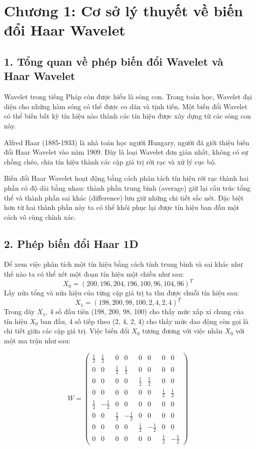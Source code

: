 \section*{Chương 1: Cơ sở lý thuyết về biến đổi Haar Wavelet}

\subsection*{1. Tổng quan về phép biến đổi Wavelet và Haar Wavelet}
Wavelet trong tiếng Pháp còn được hiểu là sóng con. Trong toán học, Wavelet đại diện cho những hàm sóng
có thể được co dãn và tịnh tiến. Một biến đổi Wavelet có thể biến bất kỳ tín hiệu nào thành các tín hiệu được xây dựng
từ các sóng con này.

Alfred Haar (1885-1933) là nhà toán học người Hungary, người đã giới thiệu biến đổi Haar Wavelet vào năm 1909. 
Đây là loại Wavelet đơn giản nhất, không có sự chồng chéo, chia tín hiệu thành các cặp giá trị rời rạc và xử lý cục bộ.

Biến đổi Haar Wavelet hoạt động bằng cách phân tách tín hiệu rời rạc thành hai phần có độ dài bằng nhau: 
thành phần trung bình (average) giữ lại cấu trúc tổng thể và thành phần sai khác (difference) lưu giữ những chi tiết sắc nét.
Đặc biệt hơn từ hai thành phần này ta có thể khôi phục lại được tín hiệu ban đầu một cách vô cùng chính xác. 

\subsection*{2. Phép biến đổi Haar 1D}
Để xem việc phân tích một tín hiệu bằng cách tính trung bình và sai khác như thế nào ta có thể xét một đoạn tín hiệu một chiều như sau:
$$X_{0}=(200,196,204,196,100,96,104,96)^T$$
Lấy nửa tổng và nửa hiệu của từng cặp giá trị ta thu được chuỗi tín hiệu sau:
$$X_{1} = (198, 200, 98, 100, 2, 4, 2, 4)^T$$
Trong dãy $X_{1}$, 4 số đầu tiên (198, 200, 98, 100) cho thấy mức xấp xỉ chung của tín hiệu $X_0$ ban đầu, 4 số tiếp theo (2, 4, 2, 4) cho thấy mức dao động còn gọi là chi tiết giữa 
các cặp giá trị. Việc biến đổi $X_0$ tương đương với việc nhân $X_0$ với một ma trận như sau:
\begin{center}
    $$W = \begin{pmatrix}
        \frac{1}{2} &  \frac{1}{2} &  0 &  0 &  0 &  0 &  0 &  0 \\
        0 &  0 &  \frac{1}{2} &  \frac{1}{2} &  0 &  0 &  0 &  0 \\
        0 &  0 &  0 &  0 &  \frac{1}{2} &  \frac{1}{2} &  0 &  0 \\
        0 &  0 &  0 &  0 &  0 &  0 &  \frac{1}{2} &  \frac{1}{2} \\
        \frac{1}{2} & -\frac{1}{2} &  0 &  0 &  0 &  0 &  0 &  0 \\
        0 &  0 &  \frac{1}{2} & -\frac{1}{2} &  0 &  0 &  0 &  0 \\
        0 &  0 &  0 &  0 &  \frac{1}{2} & -\frac{1}{2} &  0 &  0 \\
        0 &  0 &  0 &  0 &  0 &  0 &  \frac{1}{2} & -\frac{1}{2}
    \end{pmatrix}$$
\end{center}

